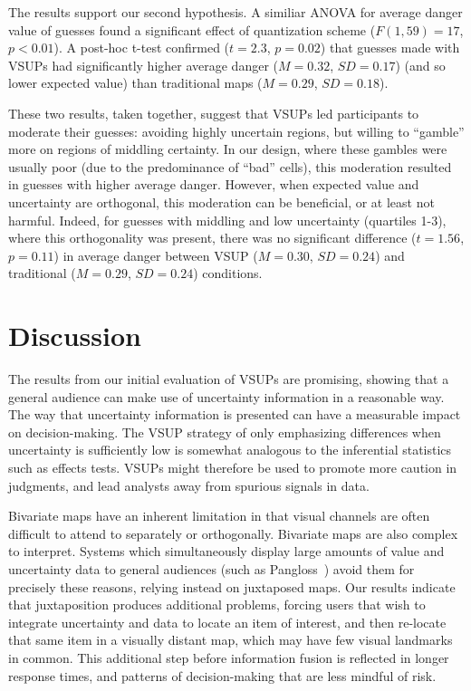 The results support our second hypothesis. A similiar ANOVA for average danger value of guesses found a significant effect of quantization scheme ($F(1,59)=17$, $p<0.01$). A post-hoc t-test confirmed ($t=2.3$, $p=0.02$) that guesses made with VSUPs had significantly higher average danger ($M=0.32$, $SD=0.17$) (and so lower expected value) than traditional maps ($M=0.29$, $SD=0.18$).

These two results, taken together, suggest that VSUPs led participants to moderate their guesses: avoiding highly uncertain regions, but willing to ``gamble'' more on regions of middling certainty. In our design, where these gambles were usually poor (due to the predominance of ``bad'' cells), this moderation resulted in guesses with higher average danger. However, when expected value and uncertainty are orthogonal, this moderation can be beneficial, or at least not harmful. Indeed, for guesses with middling and low uncertainty (quartiles 1-3), where this orthogonality was present, there was no significant difference ($t=1.56$, $p=0.11$) in average danger between VSUP ($M=0.30$, $SD=0.24$) and traditional ($M=0.29$, $SD=0.24$) conditions. 

\section{Discussion}


The results from our initial evaluation of VSUPs are promising, showing that a general audience can make use of uncertainty information in a reasonable way. The way that uncertainty information is presented can have a measurable impact on decision-making. The VSUP strategy of only emphasizing differences when uncertainty is sufficiently low is somewhat analogous to the inferential statistics such as effects tests. VSUPs might therefore be used to promote more caution in judgments, and lead analysts away from spurious signals in data.

Bivariate maps have an inherent limitation in that visual channels are often difficult to attend to separately or orthogonally. Bivariate maps are also complex to interpret. Systems which simultaneously display large amounts of value and uncertainty data to general audiences (such as Pangloss~\cite{moritz2017trust}) avoid them for precisely these reasons, relying instead on juxtaposed maps. Our results indicate that juxtaposition produces additional problems, forcing users that wish to integrate uncertainty and data to locate an item of interest, and then re-locate that same item in a visually distant map, which may have few visual landmarks in common. This additional step before information fusion is reflected in longer response times, and patterns of decision-making that are less mindful of risk.

